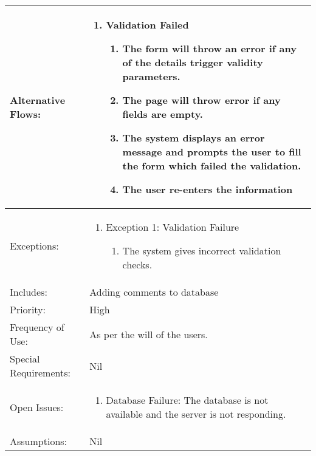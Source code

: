 \documentclass[12pt]{article}
\begin{document}
\begin{center}
\begin{longtable}{ | p{3cm} | p{3cm} | p{3cm} | p{3cm} | }
        \hline
        Alternative Flows: & \multicolumn{3}{p{9cm}|}{
            \begin{enumerate}
                \item Validation Failed
                \begin{enumerate}
                    \item The form will throw an error if any of the details trigger validity parameters.  
                    \item The page will throw error if any fields are empty.
                    \item The system displays an error message and prompts the user to fill the form which failed the validation.
                    \item The user re-enters the information
                \end{enumerate}
            \end{enumerate}
        }\\
        \hline
        Exceptions: & \multicolumn{3}{p{9cm}|}{
            \begin{enumerate}
                \item Exception 1: Validation Failure
                \begin{enumerate}
                    \item The system gives incorrect validation checks.
                \end{enumerate}
            \end{enumerate}
        }\\
        \hline
        Includes: & \multicolumn{3}{p{9cm}|}{Adding comments to database}\\
        \hline
        Priority: & \multicolumn{3}{p{9cm}|}{High}\\
        \hline
        Frequency of Use: & \multicolumn{3}{p{9cm}|}{As per the will of the users. }\\
        \hline
        Special Requirements: & \multicolumn{3}{p{9cm}|}{Nil}\\
        \hline
        Open Issues: & \multicolumn{3}{p{9cm}|}{
            \begin{enumerate}
                \item Database Failure: The database is not available and the server is not responding.
            \end{enumerate}
        }\\
        \hline
        Assumptions:& \multicolumn{3}{p{9cm}|}{Nil}\\
        \hline
    \end{longtable}
\end{center}
\end{document}
